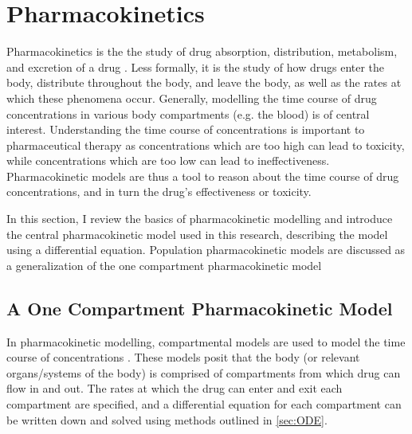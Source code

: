 \section{Pharmacokinetics} \label{PKPD}

Pharmacokinetics is the the study of drug absorption, distribution, metabolism, and excretion of a drug \cite{rosenbaum2016basic}.  Less formally,  it is the study of how drugs enter the body, distribute throughout the body, and leave the body, as well as the rates at which these phenomena occur.  Generally, modelling the time course of drug concentrations in various body compartments (e.g. the blood) is of central interest.  Understanding the time course of concentrations is important to pharmaceutical therapy as concentrations which are too high can lead to toxicity, while concentrations which are too low can lead to ineffectiveness.  Pharmacokinetic models are thus a tool to reason about the time course of drug concentrations, and in turn the drug's effectiveness or toxicity.

In this section, I review the basics of pharmacokinetic modelling and introduce the central pharmacokinetic model used in this research, describing the model using a differential equation.  Population pharmacokinetic models are discussed as a generalization of the one compartment pharmacokinetic model


\subsection{A One Compartment Pharmacokinetic Model} 

In pharmacokinetic modelling, compartmental models are used to model the time course of concentrations \cite{rosenbaum2016basic}. These models posit that the body (or relevant organs/systems of the body) is comprised of compartments from which drug can flow in and out. The rates at which the drug can enter and exit each compartment are specified, and a differential equation for each compartment can be written down and solved using methods outlined in \cref{sec:ODE}.

